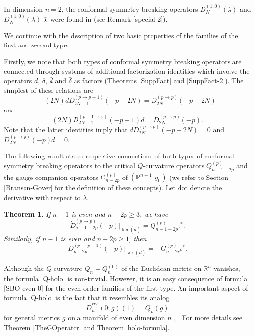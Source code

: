 \documentclass[a4paper,12pt,reqno]{amsart}
\newtheorem{thm}{Theorem}
\numberwithin{theorem}{subsection}
\numberwithin{equation}{section}
\begin{document}
In dimension $n=2$, the conformal symmetry breaking operators
$D_N^{(1,0)}(\lambda)$ and $D_N^{(1,0)}(\lambda) \, \bar{\star}$ were found in
\cite{KKP} (see Remark \ref{special-2}).

We continue with the description of two basic properties of the families of the
first and second type.

Firstly, we note that both types of conformal symmetry breaking operators are
connected through systems of additional factorization identities which involve
the operators $d$, $\delta$, $\bar{d}$ and $\bar{\delta}$ as factors (Theorems
\ref{SuppFact} and \ref{SuppFact-2}). The simplest of these relations are
\begin{equation}\label{B-fact-1}
   -(2N) {d} D_{2N-1}^{(p \to p-1)}(-p\!+\!2N) = D_{2N}^{(p \to p)}(-p\!+\!2N)
\end{equation}
and
\begin{equation}\label{B-fact-2}
   (2N) D_{2N-1}^{(p+1 \to p)}(-p\!-\!1) \bar{d} = D_{2N}^{(p \to p)}(-p).
\end{equation}
Note that the latter identities imply that $d D_{2N}^{(p \to p)}(-p\!+\!2N) =
0$ and $D_{2N}^{(p \to p)}(-p) \bar{d} = 0$.

The following result states respective connections of both types of conformal
symmetry breaking operators to the critical $Q$-curvature operators
$Q_{n-1-2p}^{(p)}$ and the gauge companion operators $G^{(p)}_{n-2p}$ of
$({\mathbb{R}}^{n-1},g_0)$ (we refer to Section \ref{Branson-Gover} for the definition of
these concepts). Let dot denote the derivative with respect to $\lambda$.

\begin{thm}\label{G-Q-holo} If $n-1$ is even and $n-2p \ge 3$, we have
\begin{equation}\label{Q-holo}
    \dot{D}^{(p \to p)}_{n-1-2p}(-p)|_{\ker(\bar{d})} = Q_{n-1-2p}^{(p)} \iota^*.
\end{equation}
Similarly, if $n-1$ is even and $n-2p \ge 1$, then
\begin{equation}\label{G-holo}
    D^{(p\to p-1)}_{n-2p}(-p)|_{\ker(\bar{d})} = - G^{(p)}_{n-2p} \iota^*.
\end{equation}
\end{thm}

Although the $Q$-curvature $Q_n = Q_n^{(0)}$ of the Euclidean metric on ${\mathbb{R}}^n$
vanishes, the formula \eqref{Q-holo} is non-trivial. However, it is an easy
consequence of formula \eqref{SBO-even-0} for the even-order families of the
first type. An important aspect of formula \eqref{Q-holo} is the fact that it
resembles its analog
$$
   \dot{D}_n^{res}(0;g)(1) = Q_n(g)
$$
for general metrics $g$ on a manifold of even dimension $n$ \cite{Juhl},
\cite{JG-holo}. For more details see Theorem \ref{TheGOperator} and Theorem
\ref{holo-formula}.
\end{document}
